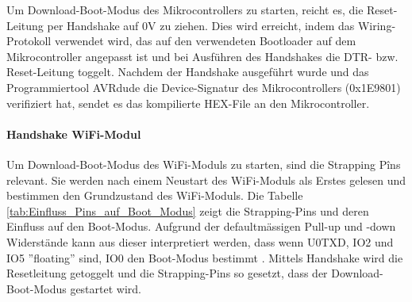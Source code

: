 Um Download-Boot-Modus des Mikrocontrollers zu starten, reicht es, die Reset-Leitung per Handshake auf 0V zu ziehen. Dies wird erreicht, indem das Wiring-Protokoll verwendet wird, das auf den verwendeten Bootloader auf dem Mikrocontroller angepasst ist und bei Ausführen des Handshakes die DTR- bzw. Reset-Leitung toggelt. Nachdem der Handshake ausgeführt wurde und das Programmiertool AVRdude die Device-Signatur des Mikrocontrollers (0x1E9801) verifiziert hat, sendet es das kompilierte HEX-File an den Mikrocontroller.


\paragraph{Handshake WiFi-Modul}\mbox{}

Um Download-Boot-Modus des WiFi-Moduls zu starten, sind die Strapping Pîns relevant. Sie werden nach einem Neustart des WiFi-Moduls als Erstes gelesen und bestimmen den Grundzustand des WiFi-Moduls. Die Tabelle \ref{tab:Einfluss_Pins_auf_Boot_Modus} zeigt die Strapping-Pins und deren Einfluss auf den Boot-Modus. Aufgrund der defaultmässigen Pull-up und -down Widerstände kann aus dieser interpretiert werden, dass wenn U0TXD, IO2 und IO5 ''floating'' sind, IO0 den Boot-Modus bestimmt \cite[S.12-S.14]{espressif_systems_esp32_2016}. Mittels Handshake wird die Resetleitung getoggelt und die Strapping-Pins so gesetzt, dass der Download-Boot-Modus gestartet wird.


